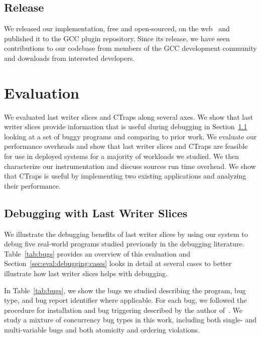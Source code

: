 \documentclass[preprint,9pt]{sigplanconf}
\newcommand{\ctraps}{CTraps\xspace}
\begin{document}
\subsection{Release}
We released our implementation, free and open-sourced, on the
web~\cite{ctrapsrelease} and published it to the GCC plugin repository.
Since its release, we have seen contributions to our codebase from members of
the GCC development community and downloads from interested developers.

\section{Evaluation}
\label{sec:eval}
We evaluated last writer slices and \ctraps along several axes.  We show that
last writer slices provide information that is useful during debugging in
Section~\ref{sec:eval:debugging} looking at a set of buggy programs and
comparing to prior work.  We evaluate our performance overheads and
show that last writer slices and \ctraps are feasible for use in deployed
systems for a majority of workloads we studied.  We then characterize our
instrumentation and discuss sources run time overhead.   We
show that \ctraps is useful by implementing two existing applications and
analyzing their performance.    

\subsection{Debugging with Last Writer Slices}
\label{sec:eval:debugging}

We illustrate the debugging benefits of last writer slices by using our system
to debug five real-world programs studied previously in the debugging
literature.  Table~\ref{tab:bugs} provides an overview of this evaluation and
Section~\ref{sec:eval:debugging:cases} looks in detail at several cases to 
better illustrate how last writer slices helps with debugging.

In Table~\ref{tab:bugs}, we show the bugs we studied describing the program,
bug type, and bug report identifier where applicable.  For each bug, we
followed the procedure for installation and bug triggering described by the
author of~\cite{concurrencybugs}.  We study a mixture of concurrency bug types
in this work, including both single- and multi-variable bugs and both atomicity
and ordering violations.
\end{document}
